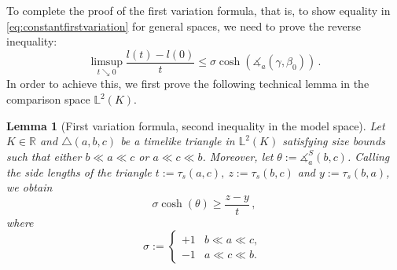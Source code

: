 \documentclass[11pt,reqno]{amsart}
\theoremstyle{definition}
\theoremstyle{definition}
\theoremstyle{plain}
\newtheorem{lem}[dfn]{Lemma}
\theoremstyle{remark}
\newcommand{\ma}{\measuredangle}
\begin{document}
To complete the proof of the first variation formula, that is, to show equality in \eqref{eq:constantfirstvariation} for general spaces, we need to prove the reverse inequality: 
\[\limsup_{t\searrow 0}\frac{l(t)-l(0)}{t}\leq \sigma\cosh(\ma_a(\gamma,\beta_0)) \, .\]
In order to achieve this, we first prove the following technical lemma in the comparison space $\mathbb L^2(K)$.

\begin{lem}[First variation formula, second inequality in the model space]
\label{lem:firstvargeq}
     Let $K\in\mathbb R$ and $\triangle(a, b, c)$ be a timelike triangle in $\mathbb L^2(K)$ satisfying size bounds such that either $b\ll a\ll c$ or $a\ll c\ll b$. Moreover, let $\theta:=\ma^S_a(b,c)$. Calling the side lengths of the triangle $t:=\tau_s(a,c),\ z:=\tau_s(b,c)$ and $y:=\tau_s(b,a)$, we obtain
    \begin{equation*}
        \sigma\cosh(\theta)\geq\frac{z-y}{t} \, ,
    \end{equation*}
    where 
    \[\sigma:=\begin{cases}
    +1 & b\ll a\ll c,\\
    -1 & a\ll c\ll b.
\end{cases}\ \]
\end{lem}
\end{document}
